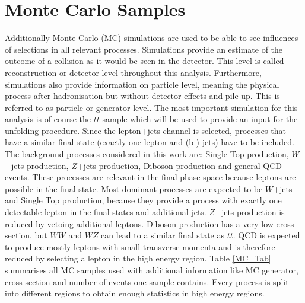	\section{Monte Carlo Samples}
	Additionally Monte Carlo (MC) simulations are used to be able to see influences of selections in all relevant processes. Simulations provide an estimate of the outcome of a collision as it would be seen in the detector. This level is called reconstruction or detector level throughout this analysis. Furthermore, simulations also provide information on particle level, meaning the physical process after hadronisation but without detector effects and pile-up. This is referred to as particle or generator level. The most important simulation for this analysis is of course the $t\bar{t}$ sample which will be used to provide an input for the unfolding procedure. Since the lepton+jets channel is selected, processes that have a similar final state (exactly one lepton and (b-) jets) have to be included. The background processes considered in this work are: Single Top production, $W$+jets production, $Z$+jets production, Diboson production and general QCD events. These processes are relevant in the final phase space because leptons are possible in the final state. Most dominant processes are expected to be $W$+jets and Single Top production, because they provide a process with exactly one detectable lepton in the final states and additional jets. $Z$+jets production is reduced by vetoing additional leptons. Diboson production has a very low cross section, but $WW$ and $WZ$ can lead to a similar final state as $t\bar{t}$. QCD is expected to produce mostly leptons with small transverse momenta and is therefore reduced by selecting a lepton in the high energy region. Table \ref{MC_Tab} summarises all MC samples used with additional information like MC generator, cross section and number of events one sample contains. Every process is split into different regions to obtain enough statistics in high energy regions.	
